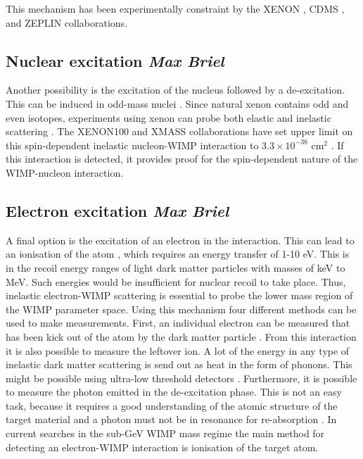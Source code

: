 \documentclass{article}
\begin{document}
This mechanism has been experimentally constraint by the XENON \cite{Aprile:2011ts}, CDMS \cite{Arrenberg:2011zz}, and ZEPLIN \cite{Akimov:2010vk} collaborations. 


\subsection{Nuclear excitation \small{\textit{Max Briel}}} 

Another possibility is the excitation of the nucleus followed by a de-excitation. This can be induced in odd-mass nuclei \cite{Baudis:2013bba}. Since natural xenon contains odd and even isotopes, experiments using xenon can probe both elastic and inelastic scattering \cite{McCabe:2015eia}. The XENON100 and XMASS collaborations have set upper limit on this spin-dependent inelastic nucleon-WIMP interaction to $3.3 \times 10^{-38}$ cm$^2$ \cite{Uchida:2014cnn, Aprile:2017ngb}. If this interaction is detected, it provides proof for the spin-dependent nature of the WIMP-nucleon interaction. 

\subsection{Electron excitation \small{\textit{Max Briel}}} 

A final option is the excitation of an electron in the interaction. This can lead to an ionisation of the atom \cite{Essig:2011nj}, which requires an energy transfer of 1-10 eV. This is in the recoil energy ranges of light dark matter particles with masses of keV to MeV. Such energies would be insufficient for nuclear recoil to take place. Thus, inelastic electron-WIMP scattering is essential to probe the lower mass region of the WIMP parameter space. Using this mechanism four different methods can be used to make measurements. First, an individual electron can be measured that has been kick out of the atom by the dark matter particle \cite{Bernabei:2007gr, Kopp:2009et, Dedes:2009bk}. From this interaction it is also possible to measure the leftover ion. A lot of the energy in any type of inelastic dark matter scattering is send out as heat in the form of phonons. This might be possible using ultra-low threshold detectors \cite{Formaggio:2011jt}. Furthermore, it is possible to measure the photon emitted in the de-excitation phase. This is not an easy task, because it requires a good understanding of the atomic structure of the target material and a photon must not be in resonance for re-absorption \cite{Starkman:1994gf}. In current searches in the sub-GeV WIMP mass regime the main method for detecting an electron-WIMP interaction is ionisation of the target atom. 
\end{document}
